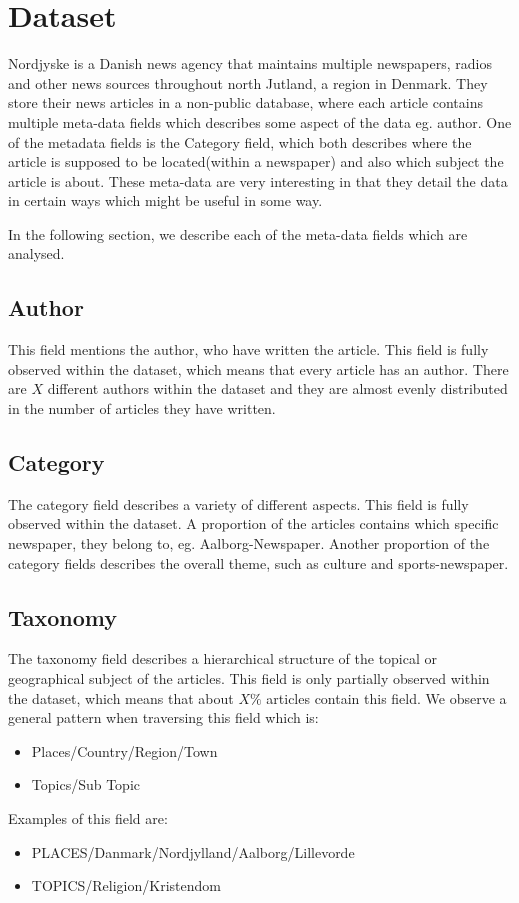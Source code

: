 \section{Dataset}
Nordjyske is a Danish news agency that maintains multiple newspapers, radios and other news sources throughout north Jutland, a region in Denmark.
They store their news articles in a non-public database, where each article contains multiple meta-data fields which describes some aspect of the data eg. author.
One of the metadata fields is the Category field, which both describes where the article is supposed to be located(within a newspaper) and also which subject the article is about.
These meta-data are very interesting in that they detail the data in certain ways which might be useful in some way.

In the following section, we describe each of the meta-data fields which are analysed.

\subsection{Author}
This field mentions the author, who have written the article.
This field is fully observed within the dataset, which means that every article has an author.
There are $X$ different authors within the dataset and they are almost evenly distributed in the number of articles they have written.

\subsection{Category}
The category field describes a variety of different aspects. 
This field is fully observed within the dataset.
A proportion of the articles contains which specific newspaper, they belong to, eg. Aalborg-Newspaper.
Another proportion of the category fields describes the overall theme, such as culture and sports-newspaper.


\subsection{Taxonomy}
The taxonomy field describes a hierarchical structure of the topical or geographical subject of the articles.
This field is only partially observed within the dataset, which means that about $X\%$ articles contain this field.
We observe a general pattern when traversing this field which is:
\begin{itemize}
	\item Places/Country/Region/Town
	\item Topics/Sub Topic
\end{itemize}
Examples of this field are:
\begin{itemize}
	\item PLACES/Danmark/Nordjylland/Aalborg/Lillevorde
	\item TOPICS/Religion/Kristendom
\end{itemize}